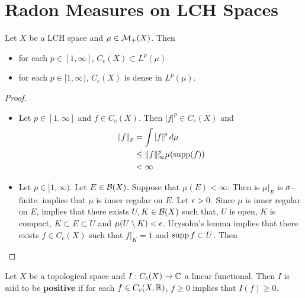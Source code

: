 \documentclass{book}
\begin{document}
	
	
	
	
	
	
	
	
	
	
	
	
	
	
	
	
	
	
	
	
	
	\newpage	
	\section{Radon Measures on LCH Spaces}
	
	\begin{ex}  
		Let $X$ be a LCH space and $\mu \in \mathcal{M}_+(X)$. Then 
		\begin{itemize}
			\item for each $p \in [1, \infty]$, $C_c(X) \subset L^p(\mu)$
			\item for each $p \in [1, \infty)$, $C_c(X)$ is dense in $L^p(\mu)$.
		\end{itemize}
	\end{ex}
	
	\begin{proof}\
		\begin{itemize}
			\item Let $p \in [1, \infty]$ and $f \in C_c(X)$. Then $|f|^p \in C_c(X)$ and 
			\begin{align*}
				\|f\|_p 
				&= \int |f|^p \, d \mu \\
				& \leq \|f\|_{\infty}^p \mu(\operatorname{supp} (f)) \\
				& < \infty
			\end{align*}	 
			\item Let $p \in [1, \infty)$. Let $E \in \mathcal{B}(X)$. Suppose that $\mu(E) < \infty$. Then is $\mu|_E$ is $\sigma$-finite.  implies that $\mu$ is inner regular on $E$. Let $\epsilon > 0$. Since $\mu$ is inner regular on $E$,  implies that there exists $U,K \in \mathcal{B}(X)$ such that, $U$ is open, $K$ is compact, $K \subset E \subset U$ and  $\mu(U \setminus K) < \epsilon$. Urysohn's lemma implies that there exists $f \in C_c(X)$ such that $f|_K = 1$ and $\operatorname{supp} f \subset U$. Then \\
			\tcb{FINISH!!!}
		\end{itemize}
	\end{proof}
	
	\begin{defn}  
	Let $X$ be a topological space and $I: C_c(X) \rightarrow \mathbb{C}$ a linear functional. Then $I$ is said to be \textbf{positive} if for each $f \in C_c(X, \mathbb{R})$, $f \geq 0 $ implies that $I(f) \geq 0$.
	\end{defn}
	
\end{document}

